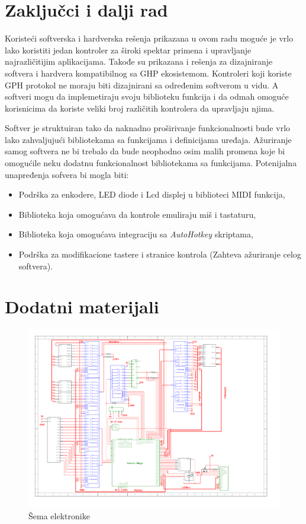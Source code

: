\documentclass[12pt,oneside]{memoir}
\begin{document}
	\chapter{Zaključci i dalji rad}
	Koristeći softverska i hardverska rešenja prikazana u ovom radu moguće je vrlo lako koristiti jedan kontroler za široki spektar primena i upravljanje najrazličitijim aplikacijama. Takođe su prikazana i rešenja za dizajniranje softvera i hardvera kompatibilnog sa GHP ekosistemom. Kontroleri koji koriste GPH protokol ne moraju biti dizajnirani sa određenim softverom u vidu. A softveri mogu da implemetiraju svoju biblioteku funkcija i da odmah omoguće korisnicima da koriste veliki broj različitih kontrolera da upravljaju njima.\newline
	
	Softver je struktuiran tako da naknadno proširivanje funkcionalnosti bude vrlo lako zahvaljujući bibliotekama sa funkcijama i definicijama uređaja. Ažuriranje samog softvera ne bi trebalo da bude neophodno osim malih promena koje bi omogućile neku dodatnu funkcionalnost bibliotekama sa funkcijama.
	Potenijalna unapređenja sofvera bi mogla biti:
	\begin{itemize}
		\item Podrška za enkodere, LED diode i Lcd displej u biblioteci MIDI funkcija,
		\item Biblioteka koja omogućava da kontrole emuliraju miš i tastaturu,
		\item Biblioteka koja omogućava integraciju sa \textit{AutoHotkey} skriptama,
		\item Podrška za modifikacione tastere i stranice kontrola (Zahteva ažuriranje celog softvera).
	\end{itemize}
	\backmatter
	\appendix
	\chapter{Dodatni materijali}
	\begin{figure}[h]
		\includegraphics[scale=0.75,angle=90]{GPCp}
		\caption{Šema elektronike}
		\label{Slika:schem}
	\end{figure}
	
	
	
	\nocite{*}
	\literatura
	
\end{document}
